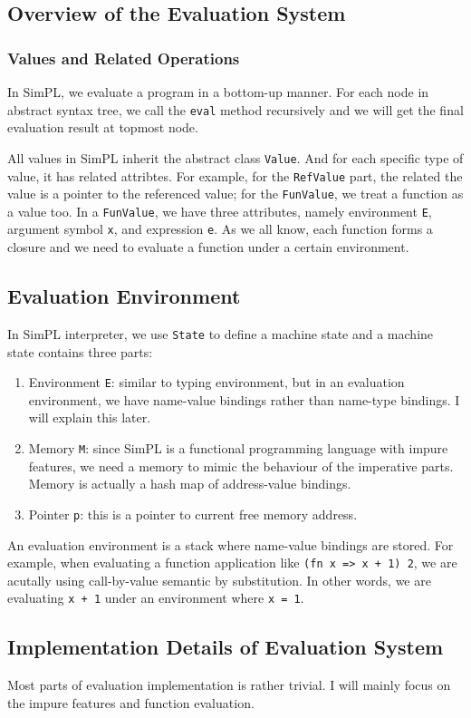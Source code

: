 \documentclass{article}
\begin{document}
\subsection{Overview of the Evaluation System}
\subsubsection{Values and Related Operations}
In SimPL, we evaluate a program in a bottom-up manner. For each node in abstract syntax tree, we call the \verb|eval| method recursively and we will get the final evaluation result at topmost node.

All values in SimPL inherit the abstract class \verb|Value|. And for each specific type of value, it has related attribtes. For example, for the \verb|RefValue| part, the related the value is a pointer to the referenced value; for the \verb|FunValue|, we treat a function as a value too. In a \verb|FunValue|, we have three attributes, namely environment \verb|E|, argument symbol \verb|x|, and expression \verb|e|. As we all know, each function forms a closure and we need to evaluate a function under a certain environment.
\subsection{Evaluation Environment}
In SimPL interpreter, we use \verb|State| to define a machine state and a machine state contains three parts:
\begin{enumerate}
	\item Environment \verb|E|: similar to typing environment, but in an evaluation environment, we have name-value bindings rather than name-type bindings. I will explain this later.
	\item Memory \verb|M|: since SimPL is a functional programming language with impure features, we need a memory to mimic the behaviour of the imperative parts. Memory is actually a hash map of address-value bindings.
	\item Pointer \verb|p|: this is a pointer to current free memory address.
\end{enumerate}
An evaluation environment is a stack where name-value bindings are stored. For example, when evaluating a function application like \verb|(fn x => x + 1) 2|, we are acutally using call-by-value semantic by substitution. In other words, we are evaluating \verb|x + 1| under an environment where \verb|x = 1|.



\subsection{Implementation Details of Evaluation System}
Most parts of evaluation implementation is rather trivial. I will mainly focus on the impure features and function evaluation.
\end{document}
